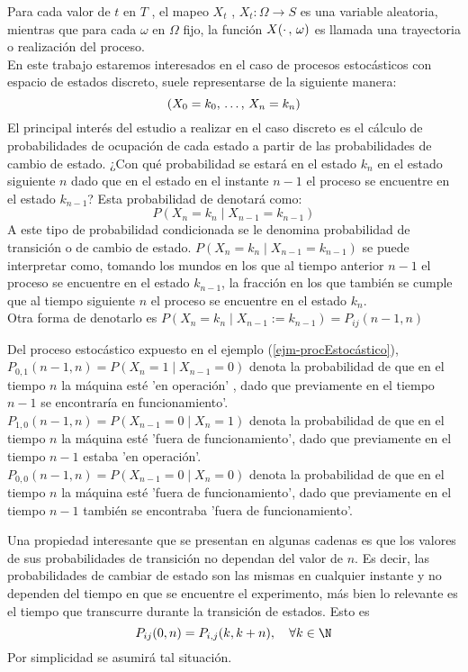 Para cada valor de $t$ en $T$ , el mapeo $X_t$ , $X_t: \Omega\rightarrow S$ es una variable aleatoria, mientras que para cada $\omega$ en $\Omega$ fijo, la función $X(\cdot\thinspace,\thinspace\omega)$ es llamada una trayectoria o realización del proceso.\\En este trabajo estaremos interesados en el caso de procesos estocásticos con espacio de estados discreto, suele representarse de la siguiente
manera: $$(X_0=k_0,\thinspace\ldots,\thinspace X_n=k_n)$$
El principal interés del estudio a realizar en el caso discreto es el cálculo de probabilidades de ocupación de cada estado a partir de las probabilidades de cambio de estado. ¿Con qué probabilidad se estará en el estado $k_n$ en
el estado siguiente $n$ dado que en el estado en el instante $n-1$ el proceso se encuentre en el estado $k_{n-1}$? Esta probabilidad de denotará como:
$$P(X_n = k_n\mid X_{n-1} = k_{n-1})$$
A este tipo de probabilidad condicionada se le denomina probabilidad de transición o de cambio de estado. $P(X_n = k_n\mid X_{n-1} = k_{n-1})$ se puede interpretar como, tomando los mundos en los que al tiempo anterior $n-1$ el proceso se encuentre en el estado $k_{n-1}$, la fracción en los que también se cumple que al tiempo siguiente $n$ el proceso se encuentre en el estado $k_n$. \\Otra forma de denotarlo es $P(X_n = k_n \mid X_{n-1} := k_{n-1})=P_{i j}{(n-1,n)}$
\begin{Ejm}
    Del proceso estocástico expuesto en el ejemplo (\ref{ejm-procEstocástico}), \\$P_{0,1}(n-1,n)=P(X_n=1\mid X_{n-1}=0)$ denota la probabilidad de que en el tiempo $n$ la máquina esté 'en operación' , dado que previamente en el tiempo $n-1$ se encontraría en
    funcionamiento'.\\
    $P_{1,0}(n-1,n)=P(X_{n-1}=0\mid X_n=1)$ denota la probabilidad de que en el tiempo $n$ la máquina esté 'fuera de funcionamiento', dado que previamente en el tiempo $n-1$ estaba 'en operación'.\\
    $P_{0,0}(n-1,n)=P(X_{n-1}=0\mid X_n=0)$ denota la probabilidad de que en el tiempo $n$ la máquina esté 'fuera de funcionamiento', dado que previamente en el tiempo $n-1$ también se encontraba 'fuera de funcionamiento'.
\end{Ejm}
Una propiedad interesante que se presentan en algunas cadenas es que los valores de sus probabilidades de transición no dependan del valor de $n$. Es decir, las probabilidades de cambiar de estado son las mismas en cualquier instante y no dependen del tiempo en que se encuentre el experimento, más bien lo relevante es el tiempo que transcurre durante la transición de estados. Esto es $$P_{i j}(0,n)=P_{i,j}(k,k+n),\quad \forall k\in\N$$ Por simplicidad se asumirá tal situación.\\
